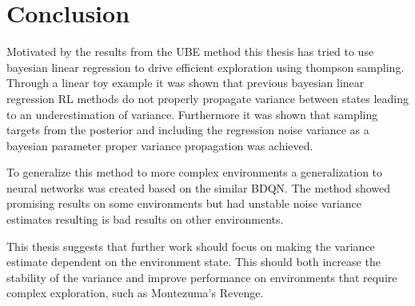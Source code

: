 
\chapter{Conclusion}\label{ch:conc}

Motivated by the results from the UBE method\citep{donoghue_2017} this thesis has tried to use bayesian linear regression to drive efficient exploration using thompson sampling. Through a linear toy example it was shown that previous bayesian linear regression RL methods do not properly propagate variance between states leading to an underestimation of variance. Furthermore  it was shown that sampling targets from the posterior and including the regression noise variance as a bayesian parameter proper variance propagation was achieved. 

To generalize this method to more complex environments a generalization to neural networks was created based on the similar \cite{azziz_2018} BDQN. The method showed promising results on some environments but had unstable noise variance estimates resulting is bad results on other environments.

This thesis suggests that further work should focus on making the variance estimate dependent on the environment state. This should both increase the stability of the variance and improve performance on environments that require complex exploration, such as Montezuma's Revenge.

\cleardoublepage